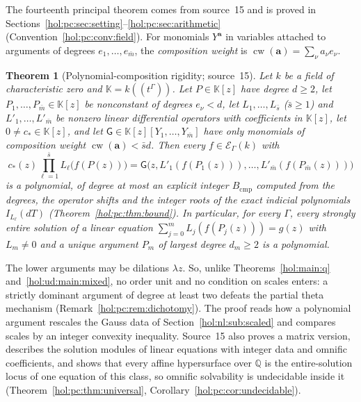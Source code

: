 \documentclass[11pt]{article}
\numberwithin{equation}{section}
\newtheorem{maintheorem}{Theorem}
\theoremstyle{definition}
\theoremstyle{remark}
\newcommand{\Q}{\mathbb Q}
\newcommand{\KK}{\mathbb K}
\newcommand{\EK}{\mathcal E_\Gamma(k)}
\begin{document}
The fourteenth principal theorem comes from source~15 and is proved in
Sections~\ref{hol:pc:sec:setting}--\ref{hol:pc:sec:arithmetic}
(Convention~\ref{hol:pc:conv:field}). For monomials $Y^{\mathbf a}$ in
variables attached to arguments of degrees $e_1,\ldots,e_{\bar m}$, the
\emph{composition weight} is $\operatorname{cw}(\mathbf a)=\sum_\nu a_\nu e_\nu$.

\begin{maintheorem}[Polynomial-composition rigidity; source~15]
\label{hol:pc:main:composition}
Let $k$ be a field of characteristic zero and $\KK=k((t^\Gamma))$. Let
$P\in\KK[z]$ have degree $d\ge2$, let $P_1,\ldots,P_{\bar m}\in\KK[z]$ be
nonconstant of degrees $e_\nu<d$, let $L_1,\ldots,L_{\bar s}$ \textup{(}$\bar
s\ge1$\textup{)} and $L'_1,\ldots,L'_{\bar m}$ be nonzero linear differential
operators with coefficients in $\KK[z]$, let $0\ne c_*\in\KK[z]$, and let
$\mathsf G\in\KK[z][Y_1,\ldots,Y_{\bar m}]$ have only monomials of composition
weight $\operatorname{cw}(\mathbf a)<\bar sd$. Then every $f\in\EK$ with
\[
 c_*(z)\prod_{\ell=1}^{\bar s}L_\ell\bigl(f(P(z))\bigr)
 =\mathsf G\bigl(z,L'_1(f(P_1(z))),\ldots,L'_{\bar m}(f(P_{\bar m}(z)))\bigr)
\]
is a polynomial, of degree at most an explicit integer $B_{\mathrm{cmp}}$
computed from the degrees, the operator shifts and the integer roots of the
exact indicial polynomials $I_{L_\ell}(dT)$ \textup{(}Theorem~\ref{hol:pc:thm:bound}\textup{)}.
In particular, for every $\Gamma$, every strongly entire solution of a linear
equation $\sum_{j=0}^mL_j(f(P_j(z)))=g(z)$ with $L_m\ne0$ and a unique
argument $P_m$ of largest degree $d_m\ge2$ is a polynomial.
\end{maintheorem}

The lower arguments may be dilations $\lambda z$. So, unlike
Theorems~\ref{hol:main:q} and~\ref{hol:ud:main:mixed}, no order unit and no
condition on scales enters: a strictly dominant argument of degree at least
two defeats the partial theta mechanism (Remark~\ref{hol:pc:rem:dichotomy}).
The proof reads how a polynomial argument rescales the Gauss data of
Section~\ref{hol:nl:sub:scaled} and compares scales by an integer convexity
inequality. Source~15 also proves a matrix version, describes the solution
modules of linear equations with integer data and omnific coefficients, and
shows that every affine hypersurface over $\Q$ is the entire-solution locus of
one equation of this class, so omnific solvability is undecidable inside it
(Theorem~\ref{hol:pc:thm:universal}, Corollary~\ref{hol:pc:cor:undecidable}).
\end{document}
